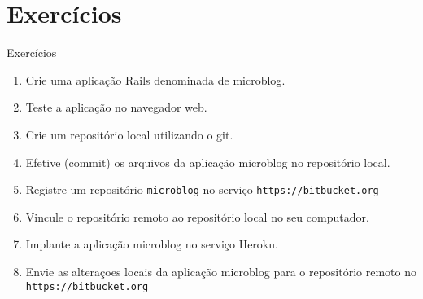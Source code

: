 \section{Exercícios}
\begin{frame}[fragile,t]{Exercícios}
  \begin{enumerate}
    \item Crie uma aplicação Rails denominada de \alert{microblog}.
    \item Teste a aplicação no navegador web.
    \item Crie um repositório local utilizando o git.
    \item Efetive (commit) os arquivos da aplicação microblog no repositório local.
    \item Registre um repositório \verb!microblog! no serviço \verb!https://bitbucket.org!
    \item Vincule o repositório remoto ao repositório local no seu computador.
    \item Implante a aplicação microblog no serviço Heroku.
    \item Envie as alteraçoes locais da aplicação microblog para o repositório remoto 
      no \verb!https://bitbucket.org!
  \end{enumerate}
\end{frame} 
